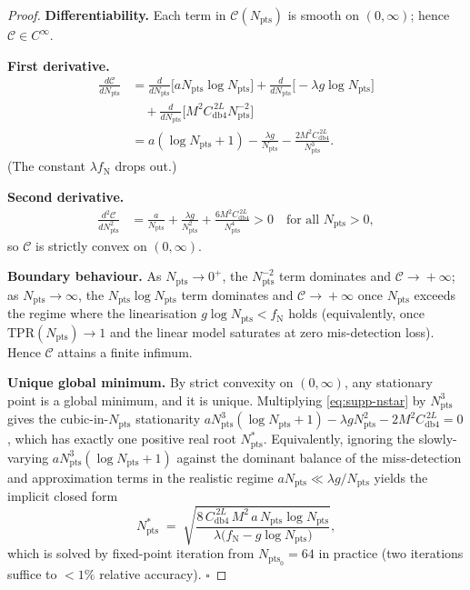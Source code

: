 \documentclass[10pt,twocolumn,a4paper]{article}
\newcommand{\Npts}{N_{\mathrm{pts}}}
\newcommand{\Nstar}{N^{*}_{\mathrm{pts}}}
\newcommand{\TPR}{\mathrm{TPR}}
\begin{document}
\begin{proof}
\textbf{Differentiability.} Each term in $\mathcal{C}(\Npts)$ is
smooth on $(0,\infty)$; hence $\mathcal{C}\in C^{\infty}$.

\textbf{First derivative.}
\begin{align*}
\tfrac{d\mathcal{C}}{d\Npts}
&=\tfrac{d}{d\Npts}\bigl[a\Npts\log\Npts\bigr]
 +\tfrac{d}{d\Npts}\bigl[-\lambda g\log\Npts\bigr]\\
&\quad+\tfrac{d}{d\Npts}\bigl[M^{2}C_{\mathrm{db4}}^{\,2L}\Npts^{-2}\bigr]\\
&=a(\log\Npts+1)-\tfrac{\lambda g}{\Npts}-\tfrac{2M^{2}C_{\mathrm{db4}}^{\,2L}}{\Npts^{3}}.
\end{align*}
(The constant $\lambda f_{\mathrm{N}}$ drops out.)

\textbf{Second derivative.}
\begin{align*}
\tfrac{d^{2}\mathcal{C}}{d\Npts^{2}}
&=\tfrac{a}{\Npts}+\tfrac{\lambda g}{\Npts^{2}}+\tfrac{6M^{2}C_{\mathrm{db4}}^{\,2L}}{\Npts^{4}}>0
\quad\text{for all }\Npts>0,
\end{align*}
so $\mathcal{C}$ is strictly convex on $(0,\infty)$.

\textbf{Boundary behaviour.}
As $\Npts\!\to\!0^{+}$, the $\Npts^{-2}$ term dominates and
$\mathcal{C}\!\to\!+\infty$; as $\Npts\!\to\!\infty$, the
$\Npts\log\Npts$ term dominates and $\mathcal{C}\!\to\!+\infty$ once
$\Npts$ exceeds the regime where the linearisation
$g\log\Npts<f_{\mathrm{N}}$ holds (equivalently, once
$\TPR(\Npts)\!\to\!1$ and the linear model saturates at zero
mis-detection loss). Hence $\mathcal{C}$ attains a finite infimum.

\textbf{Unique global minimum.}
By strict convexity on $(0,\infty)$, any stationary point is a global
minimum, and it is unique. Multiplying \eqref{eq:supp-nstar} by
$\Npts^{3}$ gives the cubic-in-$\Npts$ stationarity
$a\Npts^{3}(\log\Npts+1)-\lambda g\Npts^{2}-2M^{2}C_{\mathrm{db4}}^{\,2L}=0$,
which has exactly one positive real root $\Nstar$. Equivalently,
ignoring the slowly-varying $a\Npts^{3}(\log\Npts+1)$ against the
dominant balance of the miss-detection and approximation terms in the
realistic regime $a\Npts\ll\lambda g/\Npts$ yields the implicit
closed form
\begin{equation}\label{eq:supp-nstar-implicit}
\Nstar\;=\;\sqrt{\frac{8\,C_{\mathrm{db4}}^{\,2L}\,M^{2}\,a\,\Npts\log\Npts}{\lambda\bigl(f_{\mathrm{N}}-g\log\Npts\bigr)}},
\end{equation}
which is solved by fixed-point iteration from $\Npts_{0}=64$ in
practice (two iterations suffice to $<\!1\%$ relative accuracy).
\hfill$\square$
\end{proof}
\end{document}

